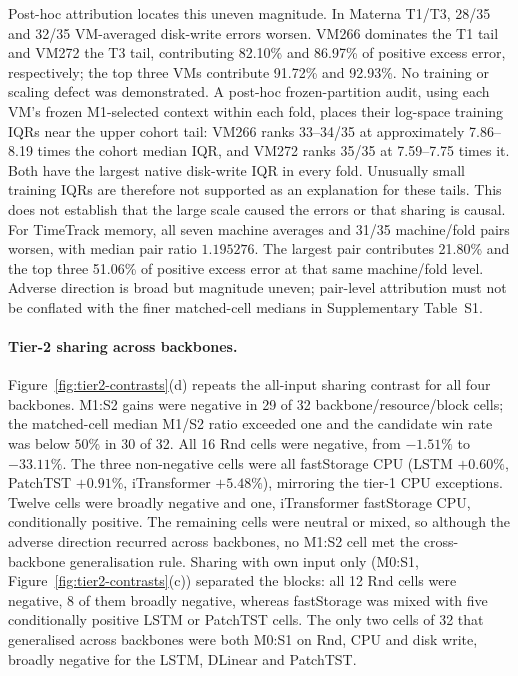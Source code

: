 \documentclass[5p,twocolumn]{elsarticle}
\begin{document}
Post-hoc attribution locates this uneven magnitude. In Materna T1/T3,
28/35 and 32/35 VM-averaged disk-write errors worsen. VM266 dominates the T1
tail and VM272 the T3 tail, contributing 82.10\% and 86.97\% of positive
excess error, respectively; the top three VMs contribute 91.72\% and 92.93\%.
No training or scaling defect was demonstrated. A post-hoc frozen-partition
audit, using each VM's frozen M1-selected context within each fold, places
their log-space training IQRs near the upper cohort tail: VM266 ranks
33--34/35 at approximately 7.86--8.19 times the cohort median IQR, and VM272
ranks 35/35 at 7.59--7.75 times it. Both have the largest native disk-write
IQR in every fold. Unusually small training IQRs are therefore not supported as an
explanation for these tails. This does not establish that the large scale
caused the errors or that sharing is causal.
For TimeTrack memory, all seven machine averages and 31/35 machine/fold
pairs worsen, with median pair ratio $1.195276$. The largest pair contributes
21.80\% and the top three 51.06\% of positive excess error at that same
machine/fold level. Adverse direction is broad but magnitude uneven;
pair-level attribution must not be
conflated with the finer matched-cell medians in Supplementary Table~S1.

\paragraph{Tier-2 sharing across backbones.}
Figure~\ref{fig:tier2-contrasts}(d) repeats the all-input sharing contrast
for all four backbones. M1:S2 gains were negative in 29 of 32
backbone/resource/block cells; the matched-cell median M1/S2 ratio exceeded
one and the candidate win rate was below $50\%$ in 30 of 32. All 16 Rnd cells
were negative, from $-1.51\%$ to $-33.11\%$. The three non-negative cells were
all fastStorage CPU (LSTM $+0.60\%$, PatchTST $+0.91\%$, iTransformer
$+5.48\%$), mirroring the tier-1 CPU exceptions. Twelve cells were broadly
negative and one, iTransformer fastStorage CPU, conditionally positive. The
remaining cells were neutral or mixed, so although the adverse direction
recurred across backbones, no M1:S2 cell met the cross-backbone
generalisation rule. Sharing with own input only (M0:S1,
Figure~\ref{fig:tier2-contrasts}(c)) separated the blocks: all 12 Rnd cells
were negative, 8 of them broadly negative, whereas fastStorage was mixed with
five conditionally positive LSTM or PatchTST cells. The only two cells of
32 that generalised across backbones were both M0:S1 on Rnd, CPU and disk
write, broadly negative for the LSTM, DLinear and PatchTST.
\end{document}
